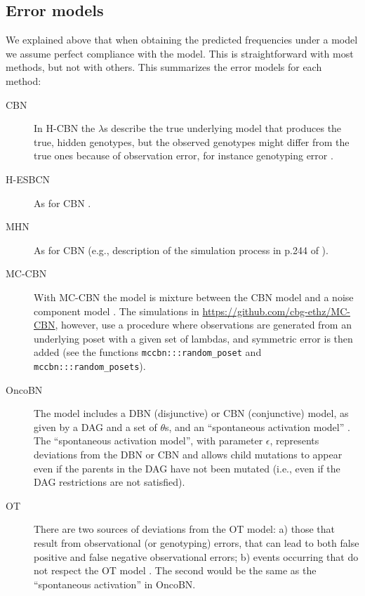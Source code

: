 \documentclass[a4paper,11pt]{article}
\begin{document}
\subsection{Error models}
\label{error_models}

We explained above that when obtaining the predicted frequencies under a model we assume perfect compliance with the model. This is straightforward with most methods, but not with others. This summarizes the error models for each method:

\begin{description}
\item[CBN] In H-CBN the $\lambda$s describe the true underlying model that produces the true, hidden genotypes, but the observed genotypes might differ from the true ones because of observation error, for instance genotyping error  \cite[p.~2810]{gerstung2009quantifying}.
\item[H-ESBCN] As for CBN \cite[p.~756]{angaroni2021}.
\item[MHN] As for CBN (e.g., description of the simulation process in p.244 of \citealp{schill2020modelling}).
\item[MC-CBN] With MC-CBN the model is mixture between the CBN model and a noise component model \cite[p.~i730-i731]{montazeri2016large}. The simulations in \url{https://github.com/cbg-ethz/MC-CBN}, however, use a procedure where observations are generated from an underlying poset with a given set of lambdas, and symmetric error is then added (see the functions \texttt{mccbn:::random\_poset} and \texttt{mccbn:::random\_posets}).
\item[OncoBN] The model includes a DBN (disjunctive) or CBN (conjunctive) model, as given by a DAG and a set of $\theta$s, and an ``spontaneous activation model'' \cite[p.~3-4]{nicol2021oncogenetic}. The ``spontaneous activation model'', with parameter $\epsilon$, represents deviations from the DBN or CBN and allows child mutations to appear even if the parents in the DAG have not been mutated (i.e., even if the DAG restrictions are not satisfied).
  
\item[OT] There are two sources of deviations from the OT model: a) those that result from observational (or genotyping) errors, that can lead to both false positive and false negative observational errors; b) events occurring that do not respect the OT model \cite{Szabo2002}. The second would be the same as the ``spontaneous activation'' in OncoBN.
  

\end{description}
\end{document}
